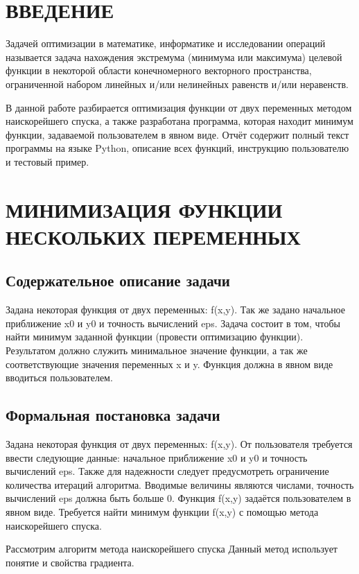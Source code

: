 

\setcounter{page}{2}
\normalfont
\tableofcontents
\clearpage
\section*{ВВЕДЕНИЕ}
Задачей оптимизации в математике, информатике и исследовании операций называется задача нахождения экстремума (минимума или максимума) целевой функции в некоторой области конечномерного векторного пространства, ограниченной набором линейных и/или нелинейных равенств и/или неравенств. 

В данной работе разбирается оптимизация функции от двух переменных методом наискорейшего спуска, а также разработана программа, которая находит минимум функции, задаваемой пользователем в явном виде. Отчёт содержит полный текст программы на языке Python, описание всех функций, инструкцию пользователю и тестовый пример. 
\clearpage
\section{МИНИМИЗАЦИЯ ФУНКЦИИ НЕСКОЛЬКИХ ПЕРЕМЕННЫХ}
\subsection{Содержательное описание задачи}
Задана некоторая функция от двух переменных: f(x,y). Так же задано начальное приближение x0 и y0 и точность вычислений eps.
Задача состоит в том, чтобы найти минимум заданной функции (провести оптимизацию функции). Результатом должно служить минимальное значение функции, а так же соответствующие значения переменных x и y. Функция должна в явном виде вводиться пользователем.
\subsection{Формальная постановка задачи}
Задана некоторая функция от двух переменных: f(x,y). От пользователя требуется ввести следующие данные: начальное приближение x0 и y0 и точность вычислений eps. Также для надежности следует предусмотреть ограничение количества итераций алгоритма. Вводимые величины являются числами, точность вычислений eps должна быть больше 0.  Функция f(x,y) задаётся пользователем в явном виде. Требуется найти минимум функции f(x,y) с помощью метода наискорейшего спуска.

Рассмотрим алгоритм метода наискорейшего спуска Данный метод использует понятие и свойства градиента.

